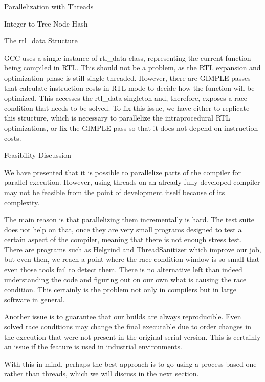 \begin{section}{Parallelization with Threads}
\begin{subsection}{Integer to Tree Node Hash}
\end{subsection}

\begin{subsection}{The rtl\_data Structure}

GCC uses a single instance of rtl\_data class, representing the current
function being compiled in RTL. This should not be a problem, as the RTL expansion
and optimization phase is still single-threaded. However, there are GIMPLE
passes that calculate instruction costs in RTL mode to decide how the function
will be optimized. This accesses the rtl\_data singleton and, therefore, exposes
a race condition that needs to be solved. To fix this issue, we have either to
replicate this structure, which is necessary to parallelize the intraprocedural
RTL optimizations, or fix the GIMPLE pass so that it does not depend on
instruction costs.

\end{subsection}

\begin{subsection}{Feasibility Discussion}

We have presented that it is possible to parallelize parts of the compiler for
parallel execution. However, using threads on an already fully developed
compiler may not be feasible from the point of development itself because of
its complexity.

The main reason is that parallelizing them incrementally is hard. The test suite
does not help on that, once they are very small programs designed to test a
certain aspect of the compiler, meaning that there is not enough stress test.
There are programs such as Helgrind and ThreadSanitizer which improve our job,
but even then, we reach a point where the race condition window is so small
that even those tools fail to detect them. There is no alternative left than
indeed understanding the code and figuring out on our own what is causing the
race condition. This certainly is the problem not only in compilers but in
large software in general.

Another issue is to guarantee that our builds are always reproducible.
Even solved race conditions may change the final executable due to order
changes in the execution that were not present in the original serial version.
This is certainly an issue if the feature is used in industrial environments.

With this in mind, perhaps the best approach is to go using a process-based
one rather than threads, which we will discuss in the next section.

\end{subsection}

\end{section}

